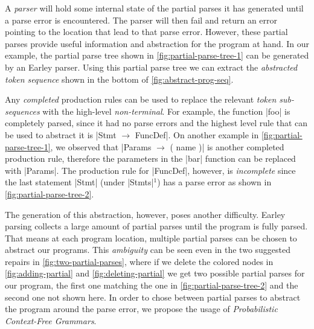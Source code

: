 A \emph{parser} will hold some internal state of the partial parses it has
generated until a parse error is encountered. The parser will then fail and
return an error pointing to the location that lead to that parse error. However,
these partial parses provide useful information and abstraction for the program
at hand. In our example, the partial parse tree shown in
\autoref{fig:partial-parse-tree-1} can be generated by an Earley parser. Using
this partial parse tree we can extract the \emph{abstracted token sequence}
shown in the bottom of \autoref{fig:abstract-prog-seq}.

Any \emph{completed} production rules can be used to replace the relevant
\emph{token sub-sequences} with the high-level \emph{non-terminal}. For example,
the function |foo| is completely parsed, since it had no parse errors and the
highest level rule that can be used to abstract it is
%
|Stmt $\rightarrow$ FuncDef|. On another example in
\autoref{fig:partial-parse-tree-1}, we observed that
%
|Params $\rightarrow$ ( name )| is another completed production rule, therefore
the parameters in the |bar| function can be replaced with |Params|. The
production rule for |FuncDef|, however, is \emph{incomplete} since the last
statement |Stmt| (under |Stmts|$^1$) has a parse error as shown in
\autoref{fig:partial-parse-tree-2}.

The generation of this abstraction, however, poses another difficulty. Earley
parsing collects a large amount of partial parses until the program is fully
parsed. That means at each program location, multiple partial parses can be
chosen to abstract our programs. This \emph{ambiguity} can be seen even in the
two suggested repairs in \autoref{fig:two-partial-parses}, where if we delete
the colored nodes in \autoref{fig:adding-partial} and
\autoref{fig:deleting-partial} we get two possible partial parses for our
program, the first one matching the one in \autoref{fig:partial-parse-tree-2}
and the second one not shown here. In order to chose between partial parses to
abstract the program around the parse error, we propose the usage of
\emph{Probabilistic Context-Free Grammars}.


